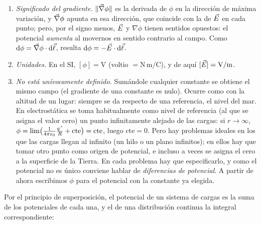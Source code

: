 \begin{observacion}\label{obs:potencial}
\begin{enumerate}[label=(\alph*)]
  \item \emph{Significado del gradiente.} $\lVert \vec{\nabla}\phi\rVert$ es la derivada de $\phi$ en la dirección de máxima variación, y $\vec{\nabla}\phi$
        apunta en esa dirección, que coincide con la de $\vec{E}$ en cada punto; pero, por el signo menos, $\vec{E}$ y $\nabla\phi$ tienen
        sentidos opuestos: el potencial \emph{aumenta} al movernos en sentido contrario al campo. Como $\mathrm{d}\phi=\vec{\nabla}\phi\cdot\mathrm{d}\vec{\ell}$,
        resulta $\mathrm{d}\phi=-\vec{E}\cdot\mathrm{d}\vec{\ell}$.
  \item \emph{Unidades.} En el SI, $[\phi]=\mathrm{V}$ (voltio $=\mathrm{N\,m/C}$), y de aquí $[\vec{E}]=\mathrm{V/m}$.
  \item \emph{No está unívocamente definido.} Sumándole cualquier constante se obtiene el mismo campo (el gradiente de una constante
        es nulo). Ocurre como con la altitud de un lugar: siempre se da respecto de una referencia, el nivel del mar. En electrostática se toma
        habitualmente como nivel de referencia (al que se asigna el valor cero) un punto infinitamente alejado de las cargas: si
        $r\to\infty$, $\phi=\lim\bigl(\frac{1}{4\pi\varepsilon_{0}}\frac{q\,'}{R}+\text{cte}\bigr)=\text{cte}$, luego $\text{cte}=0$. Pero hay
        problemas ideales en los que las cargas llegan al infinito (un hilo o un plano infinitos); en ellos hay que tomar otro punto como
        origen de potencial, e incluso a veces se asigna el cero a la superficie de la Tierra. En cada problema hay que especificarlo, y
        como el potencial no es único conviene hablar de \emph{diferencias de potencial}. A partir de ahora escribimos $\phi$ para el potencial con
        la constante ya elegida.
\end{enumerate}
\end{observacion}

Por el principio de superposición, el potencial de un sistema de cargas es la suma de los potenciales de cada una, y el de una
distribución continua la integral correspondiente:

